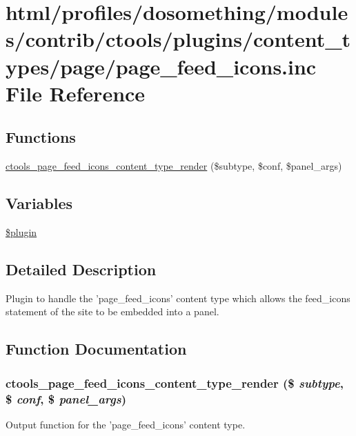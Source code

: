 \hypertarget{page__feed__icons_8inc}{
\section{html/profiles/dosomething/modules/contrib/ctools/plugins/content\_\-types/page/page\_\-feed\_\-icons.inc File Reference}
\label{page__feed__icons_8inc}
}
\subsection*{Functions}
\begin{DoxyCompactItemize}
\item 
\hyperlink{page__feed__icons_8inc_a5ede7f9fdc00105626c7e139caa9ce8f}{ctools\_\-page\_\-feed\_\-icons\_\-content\_\-type\_\-render} (\$subtype, \$conf, \$panel\_\-args)
\end{DoxyCompactItemize}
\subsection*{Variables}
\begin{DoxyCompactItemize}
\item 
\hyperlink{page__feed__icons_8inc_ada8a7130088351710bb02ed622d6bf65}{\$plugin}
\end{DoxyCompactItemize}


\subsection{Detailed Description}
Plugin to handle the 'page\_\-feed\_\-icons' content type which allows the feed\_\-icons statement of the site to be embedded into a panel. 

\subsection{Function Documentation}
\hypertarget{page__feed__icons_8inc_a5ede7f9fdc00105626c7e139caa9ce8f}{
\subsubsection[{ctools\_\-page\_\-feed\_\-icons\_\-content\_\-type\_\-render}]{\setlength{\rightskip}{0pt plus 5cm}ctools\_\-page\_\-feed\_\-icons\_\-content\_\-type\_\-render (\$ {\em subtype}, \/  \$ {\em conf}, \/  \$ {\em panel\_\-args})}}
\label{page__feed__icons_8inc_a5ede7f9fdc00105626c7e139caa9ce8f}
Output function for the 'page\_\-feed\_\-icons' content type.

